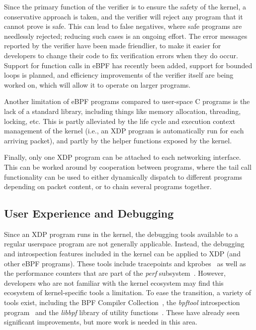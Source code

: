 \documentclass[sigconf]{acmart}
\begin{document}
Since the primary function of the verifier is to ensure the safety of the
kernel, a conservative approach is taken, and the verifier will reject any
program that it cannot prove is safe. This can lead to false negatives, where
safe programs are needlessly rejected; reducing such cases is an ongoing effort.
The error messages reported by the verifier have been made friendlier, to make
it easier for developers to change their code to fix verification errors when
they do occur. Support for function calls in eBPF has recently been added,
support for bounded loops is planned, and efficiency improvements of the
verifier itself are being worked on, which will allow it to operate on larger
programs.

Another limitation of eBPF programs compared to user-space C programs is the
lack of a standard library, including things like memory allocation, threading,
locking, etc. This is partly alleviated by the life cycle and execution context
management of the kernel (i.e., an XDP program is automatically run for each
arriving packet), and partly by the helper functions exposed by the kernel.

Finally, only one XDP program can be attached to each networking interface. This
can be worked around by cooperation between programs, where the tail call
functionality can be used to either dynamically dispatch to different programs
depending on packet content, or to chain several programs together.

\subsection{User Experience and Debugging}
\label{sec:user-exper-debugg}
Since an XDP program runs in the kernel, the debugging tools available to a
regular userspace program are not generally applicable. Instead, the debugging
and introspection features included in the kernel can be applied to XDP (and
other eBPF programs). These tools include tracepoints and
kprobes~\cite{kernel-tracing} as well as the performance counters that are part
of the \emph{perf} subsystem~\cite{perf}. However, developers who are not
familiar with the kernel ecosystem may find this ecosystem of kernel-specific
tools a limitation. To ease the transition, a variety of tools exist, including
the BPF Compiler Collection~\cite{bcc}, the \emph{bpftool} introspection
program~\cite{bpftool} and the \emph{libbpf} library of utility
functions~\cite{libbpf}. These have already seen significant improvements, but
more work is needed in this area.
\end{document}
